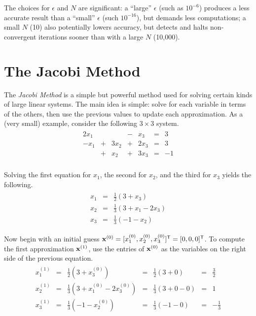 The choices for $\epsilon$ and $N$ are significant: a ``large'' $\epsilon$ (such as $10^{-6}$) produces a less accurate result than a ``small'' $\epsilon$ (such $10^{-16}$), but demands less computations; a small $N$ (10) also potentially lowers accuracy, but detects and halts non-convergent iterations sooner than with a large $N$ (10,000).

\section*{The Jacobi Method} %

The \emph{Jacobi Method} is a simple but powerful method used for solving certain kinds of large linear systems.
The main idea is simple: solve for each variable in terms of the others, then use the previous values to update each approximation.
As a (very small) example, consider the following $3 \times 3$ system.
\begin{align*}
\begin{array}{ccccccc}
  2x_1 &   &      & - & x_3  & = & 3  \\
  -x_1 & + & 3x_2 & + & 2x_3 & = & 3  \\
       & + & x_2  & + & 3x_3 & = & -1 \\
\end{array}
\end{align*}

Solving the first equation for $x_1$, the second for $x_2$, and the third for $x_3$ yields the following.
\begin{align*}
\begin{array}{ccc}
    x_1 & = & \frac{1}{2}(3 + x_3) \\
    x_2 & = & \frac{1}{3}(3 + x_1 - 2x_3) \\
    x_3 & = & \frac{1}{3}(-1 - x_2)
\end{array}
\end{align*}

Now begin with an initial guess $\mathbf{x}^{(0)} = [x^{(0)}_1, x^{(0)}_2, x^{(0)}_3]^{\mathsf T} = [0,0,0]^{\mathsf T}$.
To compute the first approximation $\mathbf{x}^{(1)}$, use the entries of $\mathbf{x}^{(0)}$ as the variables on the right side of the previous equation.
\begin{align*}
\begin{array}{ccccccc}
    x^{(1)}_1 & = & \frac{1}{2}(3 + x^{(0)}_3) & = & \frac{1}{2} (3 + 0) & = & \frac{3}{2} \\
    x^{(1)}_2 & = & \frac{1}{3}(3 + x^{(0)}_1 - 2x^{(0)}_3) & = & \frac{1}{3} (3 + 0 - 0) & = & 1 \\
    x^{(1)}_3 & = & \frac{1}{3}(-1 - x^{(0)}_2) & = & \frac{1}{3} (-1 - 0) & = & -\frac{1}{3} \\
\end{array}
\end{align*}


